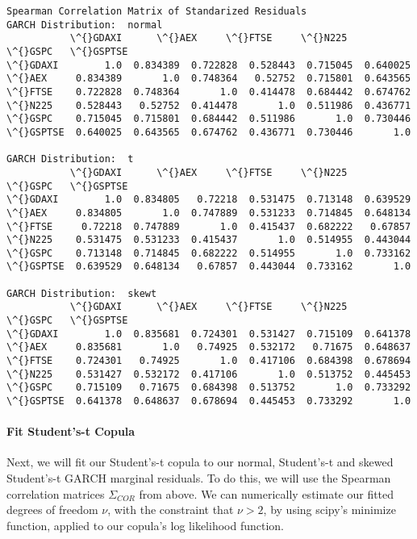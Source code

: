 \documentclass[11pt]{article}
\begin{document}
    \begin{Verbatim}[commandchars=\\\{\}]
Spearman Correlation Matrix of Standarized Residuals
GARCH Distribution:  normal
           \^{}GDAXI      \^{}AEX     \^{}FTSE     \^{}N225     \^{}GSPC   \^{}GSPTSE
\^{}GDAXI        1.0  0.834389  0.722828  0.528443  0.715045  0.640025
\^{}AEX     0.834389       1.0  0.748364   0.52752  0.715801  0.643565
\^{}FTSE    0.722828  0.748364       1.0  0.414478  0.684442  0.674762
\^{}N225    0.528443   0.52752  0.414478       1.0  0.511986  0.436771
\^{}GSPC    0.715045  0.715801  0.684442  0.511986       1.0  0.730446
\^{}GSPTSE  0.640025  0.643565  0.674762  0.436771  0.730446       1.0

GARCH Distribution:  t
           \^{}GDAXI      \^{}AEX     \^{}FTSE     \^{}N225     \^{}GSPC   \^{}GSPTSE
\^{}GDAXI        1.0  0.834805   0.72218  0.531475  0.713148  0.639529
\^{}AEX     0.834805       1.0  0.747889  0.531233  0.714845  0.648134
\^{}FTSE     0.72218  0.747889       1.0  0.415437  0.682222   0.67857
\^{}N225    0.531475  0.531233  0.415437       1.0  0.514955  0.443044
\^{}GSPC    0.713148  0.714845  0.682222  0.514955       1.0  0.733162
\^{}GSPTSE  0.639529  0.648134   0.67857  0.443044  0.733162       1.0

GARCH Distribution:  skewt
           \^{}GDAXI      \^{}AEX     \^{}FTSE     \^{}N225     \^{}GSPC   \^{}GSPTSE
\^{}GDAXI        1.0  0.835681  0.724301  0.531427  0.715109  0.641378
\^{}AEX     0.835681       1.0   0.74925  0.532172   0.71675  0.648637
\^{}FTSE    0.724301   0.74925       1.0  0.417106  0.684398  0.678694
\^{}N225    0.531427  0.532172  0.417106       1.0  0.513752  0.445453
\^{}GSPC    0.715109   0.71675  0.684398  0.513752       1.0  0.733292
\^{}GSPTSE  0.641378  0.648637  0.678694  0.445453  0.733292       1.0

    \end{Verbatim}

    \paragraph{Fit Student's-t Copula}\label{fit-students-t-copula}

Next, we will fit our Student's-t copula to our normal, Student's-t and
skewed Student's-t GARCH marginal residuals. To do this, we will use the
Spearman correlation matrices \(\Sigma_{COR}\) from above. We can
numerically estimate our fitted degrees of freedom \(\nu\), with the
constraint that \(\nu > 2\), by using scipy's minimize function, applied
to our copula's log likelihood function.
\end{document}
